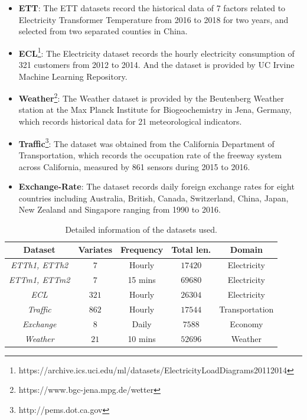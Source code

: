 \documentclass[final,3p,times]{elsarticle}
\begin{document}
\begin{itemize}
\item \textbf{ETT}: The ETT datasets record the historical data of 7 factors related to Electricity Transformer Temperature from 2016 to 2018 for two years, and selected from two separated counties in China\cite{zhou2021informer}.
\item \textbf{ECL}\footnote{https://archive.ics.uci.edu/ml/datasets/ElectricityLoadDiagrams20112014}: The Electricity dataset records the hourly electricity consumption of 321 customers from 2012 to 2014. And the dataset is provided by UC Irvine Machine Learning Repository.
\item \textbf{Weather}\footnote{https://www.bgc-jena.mpg.de/wetter}: The Weather dataset is provided by the Beutenberg Weather station at the Max Planck Institute for Biogeochemistry in Jena, Germany, which records historical data for 21 meteorological indicators.
\item \textbf{Traffic}\footnote{http://pems.dot.ca.gov}: The dataset was obtained from the California Department of Transportation, which records the occupation rate of the freeway system across California, measured by 861 sensors during 2015 to 2016.
\item \textbf{Exchange-Rate}: The dataset records daily foreign exchange rates for eight countries including Australia, British, Canada, Switzerland, China, Japan, New Zealand and Singapore ranging from 1990 to 2016\cite{lai2018modeling}.
\end{itemize}

\begin{table}[!t]\small
\centering
\caption{Detailed information of the datasets used.}
\begin{tabular}{c c c c c}
    \toprule
    Dataset & Variates & Frequency & Total len. & Domain \\
    \midrule
    \textit{ETTh1, ETTh2}  & $7$    & Hourly    & $17420$   & Electricity \\
    \textit{ETTm1, ETTm2}  & $7$    & 15 mins   & $69680$   & Electricity \\
    \textit{ECL}           & $321$  & Hourly    & $26304$   & Electricity \\
    \textit{Traffic}       & $862$  & Hourly    & $17544$   & Transportation \\
    \textit{Exchange}       & $8$  & Daily    & $7588$      & Economy \\
    \textit{Weather}       & $21$  & 10 mins  & $52696$     & Weather \\
    \bottomrule
\end{tabular}
\label{table:ds} 
\end{table}
\end{document}
